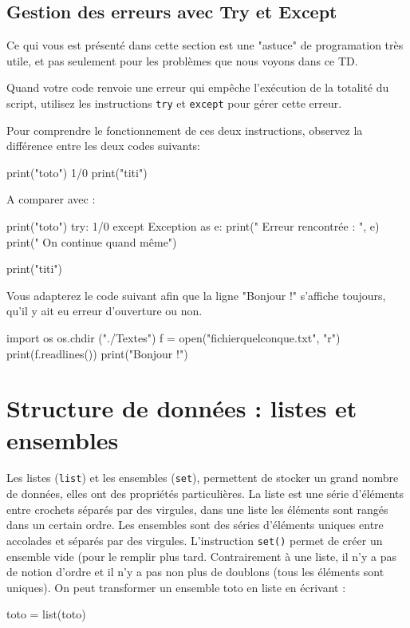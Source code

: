 \subsection{Gestion des erreurs avec Try et Except}
 Ce qui vous est présenté dans cette section est une "astuce" de programation très utile, et pas seulement pour les problèmes que nous voyons dans ce TD.

Quand votre code renvoie une erreur qui empêche l'exécution de la totalité du script, utilisez les instructions \texttt{try} et \texttt{except} pour gérer cette erreur.

Pour comprendre le fonctionnement de ces deux instructions, observez la différence entre les deux codes suivants:

\begin{python}
print("toto")
1/0
print("titi")
\end{python}

A comparer avec :
\begin{python}
print("toto")
try:
  1/0
except Exception as e:
  print(" Erreur rencontrée : ", e)
  print(" On continue quand même")

print("titi")
\end{python}

Vous adapterez le code suivant afin que la ligne "Bonjour !" s'affiche toujours, qu'il y ait eu erreur d'ouverture ou non.

\begin{python}
import os
os.chdir ("./Textes")
f = open("fichierquelconque.txt", "r")
print(f.readlines())
print("Bonjour !")
\end{python}

\section{Structure de données : listes et ensembles}%

Les listes (\texttt{list}) et les ensembles (\texttt{set}), permettent de stocker un grand nombre de données, elles ont des propriétés particulières. La liste est une série d'éléments entre crochets séparés par des virgules, dans une liste les éléments sont rangés dans un certain ordre. Les ensembles sont des séries d'éléments uniques entre accolades et séparés par des virgules. L'instruction \texttt{set()} permet de créer un ensemble vide (pour le remplir plus tard. Contrairement à une liste, il n'y a pas de notion d'ordre et il n'y a pas non plus de doublons (tous les éléments sont uniques). On peut transformer un ensemble toto en liste en écrivant :
\begin{python}
toto = list(toto)
\end{python}

